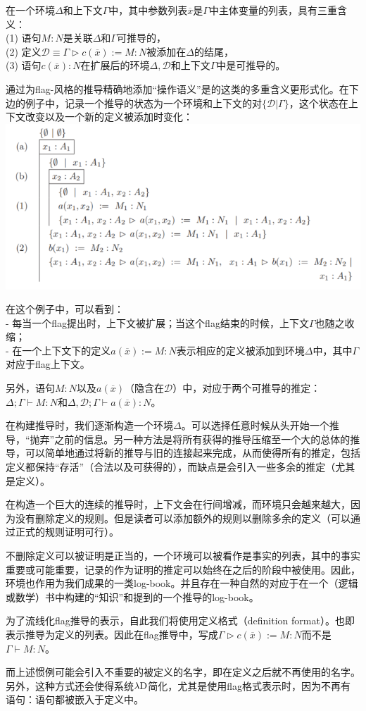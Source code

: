 \documentclass[UTF8]{article}
\begin{document}
	\noindent
	在一个环境$\Delta$和上下文$\Gamma$中，其中参数列表$\overline{x}$是$\Gamma$中主体变量的列表，具有三重含义：\\
	(1) 语句$M:N$是关联$\Delta$和$\Gamma$可推导的，\\
	(2) 定义$\mathcal{D}\equiv\Gamma\triangleright c(\overline{x}):=M:N$被添加在$\Delta$的结尾，\\
	(3) 语句$c(\overline{x}):N$在扩展后的环境$\Delta,\mathcal{D}$和上下文$\Gamma$中是可推导的。
	
		通过为flag-风格的推导精确地添加“操作语义”是的这类的多重含义更形式化。在下边的例子中，记录一个推导的状态为一个环境和上下文的对$\lbrace\mathcal{D}|\Gamma\rbrace$，这个状态在上下文改变以及一个新的定义被添加时变化：\\
		\includegraphics[width=0.93\linewidth]{"../imgs/11-4.png"}
	
		在这个例子中，可以看到：\\
	- 每当一个flag提出时，上下文被扩展；当这个flag结束的时候，上下文$\Gamma$也随之收缩；\\
	- 在一个上下文下的定义$a(\overline{x}):=M:N$表示相应的定义被添加到环境$\Delta$中，其中$\Gamma$对应于flag上下文。
	
		另外，语句$M:N$以及$a(\overline{x})$（隐含在$\mathcal{D}$）中，对应于两个可推导的推定：$\Delta;\Gamma\vdash M:N$和$\Delta,\mathcal{D};\Gamma\vdash a(\overline{x}):N$。
		
		在构建推导时，我们逐渐构造一个环境$\Delta$。可以选择任意时候从头开始一个推导，“抛弃”之前的信息。另一种方法是将所有获得的推导压缩至一个大的总体的推导，可以简单地通过将新的推导与旧的连接起来完成，从而使得所有的推定，包括定义都保持“存活”（合法以及可获得的），而缺点是会引入一些多余的推定（尤其是定义）。
		
		在构造一个巨大的连续的推导时，上下文会在行间增减，而环境只会越来越大，因为没有删除定义的规则。但是读者可以添加额外的规则以删除多余的定义（可以通过正式的规则证明可行）。
		
		不删除定义可以被证明是正当的，一个环境可以被看作是事实的列表，其中的事实重要或可能重要，记录的作为证明的推定可以始终在之后的阶段中被使用。因此，环境也作用为我们成果的一类log-book。并且存在一种自然的对应于在一个（逻辑或数学）书中构建的“知识”和提到的一个推导的log-book。
		
		为了流线化flag推导的表示，自此我们将使用定义格式（definition format）。也即表示推导为定义的列表。因此在flag推导中，写成$\Gamma\triangleright c(\overline{x}):=M:N$而不是$\Gamma\vdash M:N$。
		
		而上述惯例可能会引入不重要的被定义的名字，即在定义之后就不再使用的名字。另外，这种方式还会使得系统$\lambda{\rm D}$简化，尤其是使用flag格式表示时，因为不再有语句：语句都被嵌入于定义中。
\end{document}
